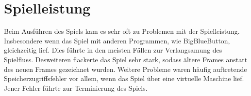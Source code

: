 %
\section{Spielleistung}
\label{Spielleistung}
%
Beim Ausf{\"u}hren des Spiels kam es sehr oft zu Problemen mit der Spielleistung. Insbesondere wenn das Spiel mit anderen Programmen, wie BigBlueButton, gleichzeitig lief. Dies f{\"u}hrte in den meisten F{\"a}llen zur Verlangsamung des Spielfluss. Desweiteren flackerte das Spiel sehr stark, sodass {\"a}ltere Frames anstatt des neuen Frames gezeichnet wurden. Weitere Probleme waren h{\"a}ufig auftretende Speicherzugriffsfehler vor allem, wenn das Spiel {\"u}ber eine virtuelle Maschine lief. Jener Fehler f{\"u}hrte zur Terminierung des Spiels.  
%
